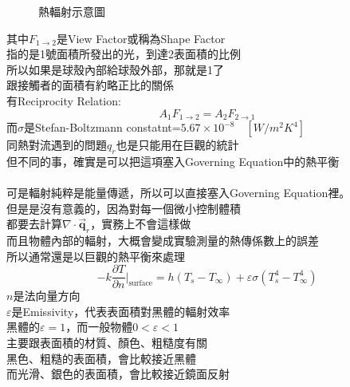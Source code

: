 \documentclass[../main.tex]{subfiles}
\begin{document}
\begin{itemize}
\begin{itemize}
\begin{figure}[H]
          \caption{熱輻射示意圖}
          \label{fig:heat_radiation}
        \end{figure}
        其中$F_{1\to 2}$是View Factor或稱為Shape Factor\\
        指的是1號面積所發出的光，到達2表面積的比例\\
        所以如果是球殼內部給球殼外部，那就是1了\\
        跟接觸者的面積有約略正比的關係\\
        有Reciprocity Relation:
        \begin{equation}
          A_1 F_{1\to 2} = A_2 F_{2\to 1}
        \end{equation}
        而$\sigma$是Stefan-Boltzmann constatnt=$5.67\times 10^{-8}\quad [W/m^2K^4]$\\
        同熱對流遇到的問題$q_r$也是只能用在巨觀的統計\\
        但不同的事，確實是可以把這項塞入Governing Equation中的熱平衡\\
        \\
        可是輻射純粹是能量傳遞，所以可以直接塞入Governing Equation裡。\\
        但是是沒有意義的，因為對每一個微小控制體積\\
        都要去計算$\nabla \cdot \vec{\bm q}_r$，實務上不會這樣做\\
        而且物體內部的輻射，大概會變成實驗測量的熱傳係數上的誤差\\
        所以通常還是以巨觀的熱平衡來處理
        \begin{equation}
          -k\frac{\partial T}{\partial n}\big|_{\text{surface}} = h\left(T_s - T_\infty\right) + \varepsilon \sigma \left(T_s^4 - T_\infty^4\right)
        \end{equation}
        $n$是法向量方向\\
        $\varepsilon$是Emissivity，代表表面積對黑體的輻射效率\\
        黑體的$\varepsilon=1$，而一般物體$0<\varepsilon<1$\\
        主要跟表面積的材質、顏色、粗糙度有關\\
        黑色、粗糙的表面積，會比較接近黑體\\
        而光滑、銀色的表面積，會比較接近鏡面反射\\

\end{itemize}
\end{itemize}
\end{document}
